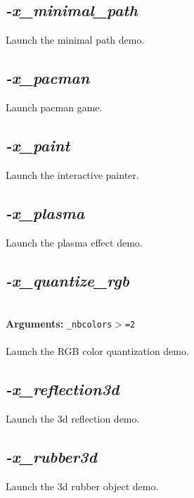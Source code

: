\documentclass[a4paper,11pt,twoside]{book}
\begin{document}
\subsection{\emph{-x\_minimal\_path} }\vspace*{-0.5em}
Launch the minimal path demo.


\subsection{\emph{-x\_pacman} }\vspace*{-0.5em}
Launch pacman game.


\subsection{\emph{-x\_paint} }\vspace*{-0.5em}
Launch the interactive painter.


\subsection{\emph{-x\_plasma} }\vspace*{-0.5em}
Launch the plasma effect demo.


\subsection{\emph{-x\_quantize\_rgb} }\vspace*{-0.5em}
~\\\textbf{Arguments: } 
{\small \texttt{\_nbcolors$>$=2}}\\~\\
Launch the RGB color quantization demo.


\subsection{\emph{-x\_reflection3d} }\vspace*{-0.5em}
Launch the 3d reflection demo.


\subsection{\emph{-x\_rubber3d} }\vspace*{-0.5em}
Launch the 3d rubber object demo.
\end{document}
